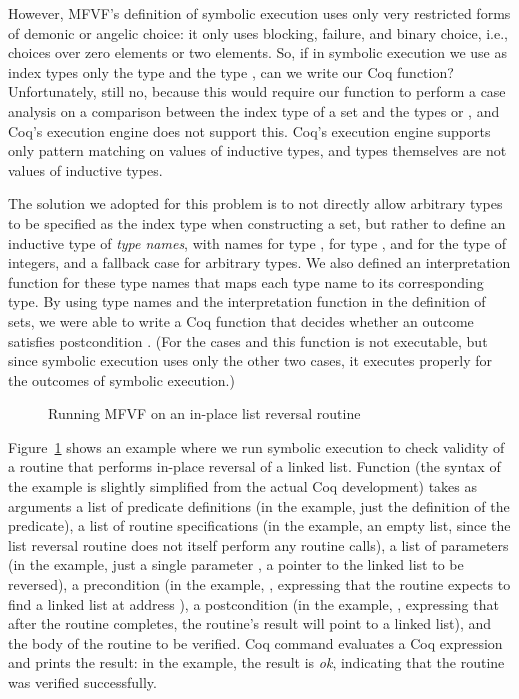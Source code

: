 \documentclass{CSML}
\theoremstyle{definition}\newtheorem{notation}[thm]{Notation}
\theoremstyle{plain}\newtheorem{satz}[thm]{Satz}
\begin{document}
However, MFVF's definition of symbolic execution uses only very restricted 
forms of demonic or angelic choice: it only uses blocking, failure, and 
binary choice, i.e., choices over zero elements or two elements. So, if in 
symbolic execution we use as index types only the type 
 and the type , can 
we write our Coq function? Unfortunately, still no, because this would 
require our function to perform a case analysis on a comparison between the 
index type of a set and the types  or 
, and Coq's execution engine does not support 
this. Coq's execution engine supports only pattern matching on values of 
inductive types, and types themselves are not values of inductive types.

The solution we adopted for this problem is to not directly allow 
arbitrary types to be specified as the index type when constructing a set, 
but rather to define an inductive type  of 
\emph{type names}, with names for type , for 
type , and for the type  of 
integers, and a fallback case  for arbitrary types. We also 
defined an interpretation function  for these type 
names that maps each type name to its corresponding type. By using type 
names and the interpretation function in the definition of sets, we were 
able to write a Coq function that decides whether an outcome satisfies 
postcondition . (For the cases  and 
 this function is not executable, but since symbolic 
execution uses only the other two cases, it executes properly for the 
outcomes of symbolic execution.)

\begin{figure}

\caption{Running MFVF on an in-place list reversal routine}\label{fig:reverse}
\end{figure}

Figure~\ref{fig:reverse} shows an example where we run symbolic execution to check validity of a 
routine that performs in-place reversal of a linked list.
Function 
 (the syntax of the example is slightly 
simplified from the actual Coq development) takes as arguments a list of 
predicate definitions (in the example, just the definition  of 
the  predicate), a list of routine specifications (in the 
example, an empty list, since the list reversal routine does not itself 
perform any routine calls), a list of parameters (in the example, just a 
single parameter , a pointer to the linked list to be 
reversed), a precondition (in the example, , 
expressing that the routine expects to find a linked list at address 
), a postcondition (in the example, 
, expressing that after the routine 
completes, the routine's result will point to a linked list), and the body 
of the routine to be verified. Coq command  evaluates a 
Coq expression and prints the result: in the example, the result is 
\textit{\textsf{ok}}, indicating that the routine was verified 
successfully. 
\end{document}
